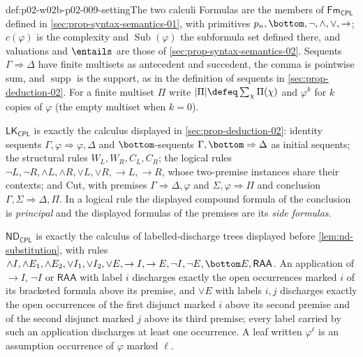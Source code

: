 \begin{hbconvention}{def:p02-w02b-p02-009-setting}{The two calculi}
Formulas are the members of \(\mathsf{Fm}_{\mathsf{CPL}}\) defined in
\cref{sec:prop-syntax-semantics-01}, with primitives
\(p_n,\bottom,\neg,\land,\lor,\to\); \(c(\varphi)\) is the complexity and
\(\operatorname{Sub}(\varphi)\) the subformula set defined there, and
valuations and \(\entails\) are those of \cref{sec:prop-syntax-semantics-02}.  Sequents
\(\Gamma\Rightarrow\Delta\) have finite multisets as antecedent and
succedent, the comma is pointwise sum, and \(\operatorname{supp}\) is the
support, as in the definition of sequents in \cref{sec:prop-deduction-02}.
For a finite multiset \(\Pi\) write \(|\Pi|\defeq\sum_{\chi}\Pi(\chi)\) and
\(\varphi^{k}\) for \(k\) copies of \(\varphi\) (the empty multiset when
\(k=0\)).

\(\mathsf{LK}_{\mathsf{CPL}}\) is exactly the calculus displayed in
\cref{sec:prop-deduction-02}: identity sequents
\(\Gamma,\varphi\Rightarrow\varphi,\Delta\) and \(\bottom\)-sequents
\(\Gamma,\bottom\Rightarrow\Delta\) as initial sequents; the structural
rules \(W_L,W_R,C_L,C_R\); the logical rules
\(\neg L,\neg R,\land L,\land R,\lor L,\lor R,\to L,\to R\), whose
two-premise instances share their contexts; and Cut, with premises
\(\Gamma\Rightarrow\Delta,\varphi\) and \(\Sigma,\varphi\Rightarrow\Pi\) and
conclusion \(\Gamma,\Sigma\Rightarrow\Delta,\Pi\).  In a logical rule the
displayed compound formula of the conclusion is \emph{principal} and the
displayed formulas of the premises are its \emph{side formulas}.

\(\mathsf{ND}_{\mathsf{CPL}}\) is exactly the calculus of labelled-discharge
trees displayed before \cref{lem:nd-substitution}, with rules
\(\land I,\land E_1,\land E_2,\lor I_1,\lor I_2,\lor E,\to I,\to E,
\neg I,\neg E,\bottom E,\mathsf{RAA}\).  An application of
\(\to I\), \(\neg I\) or \(\mathsf{RAA}\) with label \(i\) discharges exactly
the open occurrences marked \(i\) of its bracketed formula above its premise,
and \(\lor E\) with labels \(i,j\) discharges exactly the open occurrences of
the first disjunct marked \(i\) above its second premise and of the second
disjunct marked \(j\) above its third premise; every label carried by such an
application discharges at least one occurrence.  A leaf written
\(\varphi^{\ell}\) is an assumption occurrence of \(\varphi\) marked
\(\ell\).
\end{hbconvention}

